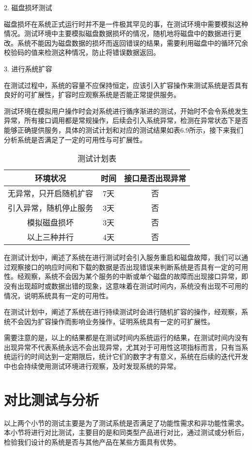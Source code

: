 2. 磁盘损坏测试

磁盘损坏在系统正式运行时并不是一件极其罕见的事，在测试环境中需要模拟这种情况。测试环境中主要模拟磁盘数据损坏的情况，随机地将磁盘中的数据进行更改。系统不能因为磁盘数据的损坏而返回错误的结果，需要利用磁盘中的循环冗余校验码的值来检测这种情况，防止将错误数据返回。

3. 进行系统扩容

在测试过程中，系统的容量不应保持恒定，应该引入扩容操作来测试系统是否具有良好的可扩展性，扩容时应观察系统是否能正常提供服务。

测试环境在模拟用户操作时会对系统进行循序渐进的测试，开始时不会令系统发生异常，所有接口调用都是常规操作，后续会引入系统异常，检测在异常状态下是否能够正确提供服务，具体的测试计划和对应的测试结果如表6.9所示，接下来我们分析系统是否满足了一定的可用性与可扩展性。

\begin{table}[h]
    \centering
    \caption{测试计划表}
    \begin{tabular}{ccc}
      \toprule
      环境状况   & 时间   & 接口是否出现异常 \\
      \midrule
      无异常，只开启随机扩容  & 7天  & 否  \\
      引入异常，随机停止服务  & 3天  & 否  \\
      模拟磁盘损坏          & 3天  & 否   \\
      以上三种并行          & 4天  & 否   \\
      \bottomrule
    \end{tabular}
\end{table}

在测试计划中，阐述了系统在进行测试时会引入服务重启和磁盘故障，我们可以通过观察接口的响应时间和下载的数据是否出现错误来判断系统是否具有一定的可用性。经观察，系统不会因为某个服务的中断或单个磁盘的故障而出现接口异常，即没有出现超时或数据出错的现象，这意味着在测试时间内，系统没有出现不可用的情况，说明系统具有一定的可用性。

在测试计划中，阐述了系统在进行持续测试时会进行随机扩容的操作，经观察，系统不会因为扩容操作而影响业务操作，证明系统具有一定的可扩展性。

需要注意的是，以上的结果都是在测试时间内系统运行的结果，在测试时间内没有出现异常不代表系统永远不会出现异常，尤其对于可用性这项指标而言，只有当系统运行的时间达到一定期限后，统计它们的数字才有意义，系统在后续的迭代开发中也会持续使用测试环境进行观察，及时发现系统的异常。

\section{对比测试与分析}%
以上两个小节的测试主要是为了测试系统是否满足了功能性需求和非功能性需求。本小节将进行对比测试，主要目的是和同类型产品进行对比，通过测试或分析后，检验我们设计的系统是否与其他产品在某些方面具有优势。

